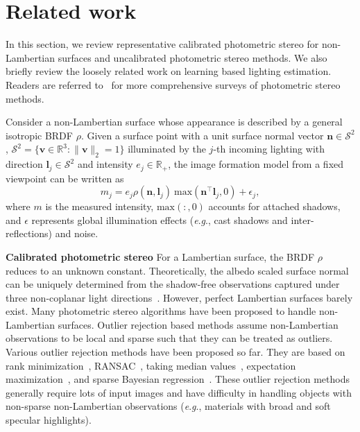 \documentclass[10pt,journal,compsoc]{IEEEtran}
\newcommand{\eg}{\textit{e}.\textit{g}.}
\newcommand{\vn}{\boldsymbol{n}}
\newcommand{\vv}{\boldsymbol{v}}
\newcommand{\vl}{\boldsymbol{l}}
\newcommand{\rev}[1]{#1}
\renewcommand{\paragraph}[1]{\vspace{0.2em}\noindent \textbf{#1 \hspace{0.2em}}}
\begin{document}
\section{Related work}
\label{sec:related_work}
In this section, we review representative calibrated photometric stereo for non-Lambertian surfaces and uncalibrated photometric stereo methods. We also briefly review the loosely related work on learning based lighting estimation. Readers are referred to~\cite{shi2018benchmark,herbort2011introduction} for more comprehensive surveys of photometric stereo methods.

\rev{Consider a non-Lambertian surface whose appearance is described by a general isotropic BRDF $\rho$. Given a surface point with a unit surface normal vector $\vn \in \mathcal{S}^2$, $\mathcal{S}^2 = \{\vv \in \mathbb{R}^3 : \|\vv\|_2 = 1\}$ illuminated by the $j$-th incoming lighting with direction $\vl_j \in \mathcal{S}^2$ and intensity $e_j \in \mathbb{R}_+$, the image formation model from a fixed viewpoint can be written as
\begin{equation}
    \label{eq:formation}
    m_j = e_j \rho (\vn, \vl_j)~\text{max}(\vn^\top \vl_j, 0) + \epsilon_j,
\end{equation}
where $m$ is the measured intensity, $\text{max}(:, 0)$ accounts for attached shadows, and $\epsilon$ represents global illumination effects (\eg, cast shadows and inter-reflections) and noise.}

\paragraph{Calibrated photometric stereo}
\rev{For a Lambertian surface, the BRDF $\rho$ reduces to an unknown constant. Theoretically, 
the albedo scaled surface normal can be uniquely determined from the shadow-free observations captured under three non-coplanar light directions~\cite{woodham1980ps}.
However, perfect Lambertian surfaces barely exist. Many photometric stereo algorithms have been proposed to handle non-Lambertian surfaces.}
Outlier rejection based methods assume non-Lambertian observations to be local and sparse such that they can be treated as outliers. Various outlier rejection methods have been proposed so far. They are based on rank minimization~\cite{wu2010robust}, RANSAC~\cite{mukaigawa2007analysis}, taking median values~\cite{miyazaki2010median}, expectation maximization~\cite{wu2010photometric}, and sparse Bayesian regression~\cite{ikehata2012robust}. These outlier rejection methods generally require lots of input images and have difficulty in handling objects with non-sparse non-Lambertian observations (\eg, materials with broad and soft specular highlights).
\end{document}

